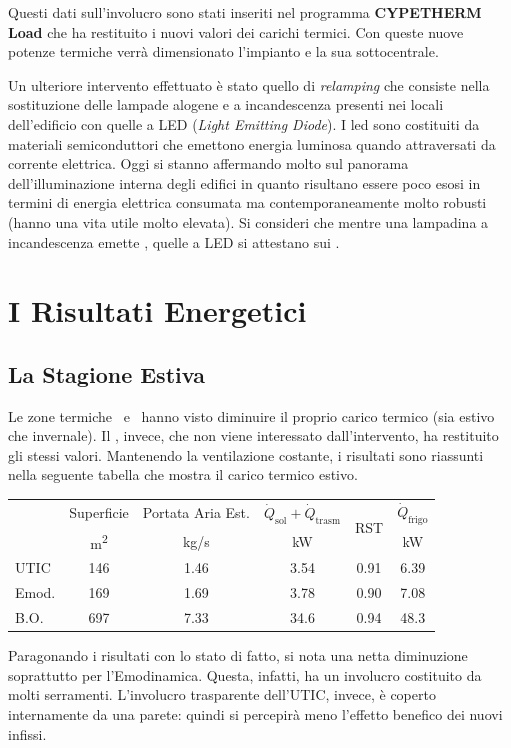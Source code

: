Questi dati sull'involucro sono stati inseriti nel programma \textbf{CYPETHERM Load} che ha restituito i nuovi valori dei carichi termici. Con queste nuove potenze termiche verrà dimensionato l'impianto e la sua sottocentrale.

Un ulteriore intervento effettuato è stato quello di \emph{relamping} che consiste nella sostituzione delle lampade alogene e a incandescenza presenti nei locali dell'edificio con quelle a LED (\emph{Light Emitting Diode}). I led sono costituiti da materiali semiconduttori che emettono energia luminosa quando attraversati da corrente elettrica. Oggi si stanno affermando molto sul panorama dell'illuminazione interna degli edifici in quanto risultano essere poco esosi in termini di energia elettrica consumata ma contemporaneamente molto robusti (hanno una vita utile molto elevata). Si consideri che mentre una lampadina a incandescenza emette , quelle a LED si attestano sui .
\section{I Risultati Energetici}
\subsection{La Stagione Estiva}
Le zone termiche \utic\ e \emod\ hanno visto diminuire il proprio carico termico (sia estivo che invernale). Il \blocc, invece, che non viene interessato dall'intervento, ha restituito gli stessi valori. Mantenendo la ventilazione costante, i risultati sono riassunti nella seguente tabella che mostra il carico termico estivo.
\begin{center}
	\begin{tabular}{lccccc}
		\toprule
		&	Superficie 				&	Portata Aria Est. 			&	$\dot{Q}_{\mathrm{sol}}+\dot{Q}_{\mathrm{trasm}}$		& 	\multirow{2}{*}{RST}		&	$\dot{Q}_{\mathrm{frigo}}$ 	\\
		&	{\small \si{m^2}}		&		{\small \si{kg/s}}		&		{\small \si{kW}}				&								&{\small \si{kW}}		\\					
		\midrule	
		UTIC		&		\num{146}			&		\num{1.46}				&	\num{3.54}		&	\num{0.91}					&	\num{6.39}		\\
		Emod.		&		\num{169}			&		\num{1.69}				&	\num{3.78}		&	\num{0.90}					&	\num{7.08}		\\
		B.O.		&		\num{697}			&		\num{7.33}				&	\num{34.6}		&	\num{0.94}					&	\num{48.3}		\\
		\bottomrule
	\end{tabular}
\end{center}
Paragonando i risultati con lo stato di fatto, si nota una netta diminuzione soprattutto per l'Emodinamica. Questa, infatti, ha un involucro costituito da molti serramenti. L'involucro trasparente dell'UTIC, invece, è coperto internamente da una parete: quindi si percepirà meno l'effetto benefico dei nuovi infissi.

